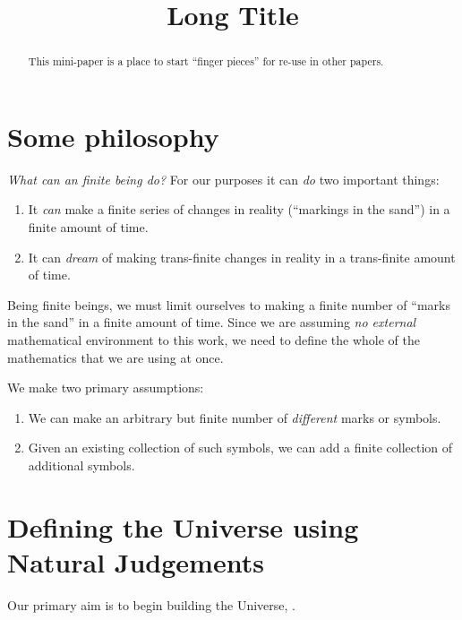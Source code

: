 \documentclass[a4paper,openany]{amsart}
\begin{document}
\sloppy

\title[Short Title]{Long Title}

%

\begin{abstract}
This mini-paper is a place to start ``finger pieces'' for re-use in other
papers.
\end{abstract} 
\maketitle 
\tableofcontents 


\section{Some philosophy}

\emph{What can an finite being do?} For our purposes it can \emph{do} two
important things:
\begin{enumerate}
\item It \emph{can} make a finite series of changes in reality (``markings in
the sand'') in a finite amount of time.
\item It can \emph{dream} of making trans-finite changes in reality in a
trans-finite amount of time.
\end{enumerate}

Being finite beings, we must limit ourselves to making a finite number of
``marks in the sand'' in a finite amount of time. Since we are assuming \emph{no
external} mathematical environment to this work, we need to define the whole of
the mathematics that we are using at once.

We make two primary assumptions:
\begin{enumerate}
\item We can make an arbitrary but finite number of \emph{different} marks or
symbols.
\item Given an existing collection of such symbols, we can add a finite
collection of additional symbols.
\end{enumerate}

\section{Defining the Universe using Natural Judgements}

Our primary aim is to begin building the Universe, \Universe{}{}.
\end{document}
